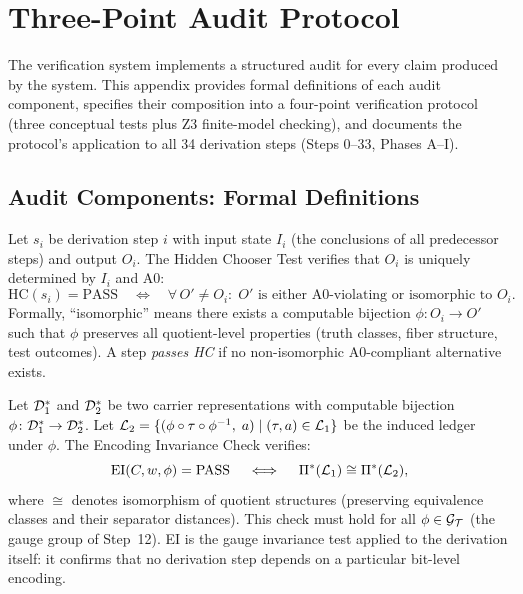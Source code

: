 \section{Three-Point Audit Protocol}
\label{app:verification}

The verification system implements a structured audit for every claim
produced by the system.  This appendix provides formal definitions of
each audit component, specifies their composition into a four-point
verification protocol (three conceptual tests plus Z3 finite-model
checking), and documents the protocol's application to all 34 derivation
steps (Steps 0--33, Phases A--I).

\subsection{Audit Components: Formal Definitions}

\begin{definition}
\label{def:hc}
Let $s_i$ be derivation step $i$ with input state $I_i$ (the conclusions
of all predecessor steps) and output $O_i$.  The Hidden Chooser Test
verifies that $O_i$ is uniquely determined by $I_i$ and A0:
\[
  \mathrm{HC}(s_i) = \mathrm{PASS} \quad\iff\quad
  \forall\, O' \neq O_i:\;
  O' \text{ is either A0-violating or isomorphic to } O_i.
\]
Formally, ``isomorphic'' means there exists a computable bijection
$\phi \colon O_i \to O'$ such that $\phi$ preserves all quotient-level
properties (truth classes, fiber structure, test outcomes).  A step
\emph{passes HC} if no non-isomorphic A0-compliant alternative exists.
\end{definition}

\begin{definition}
\label{def:ei}
Let $\mathcal{D}^*_1$ and $\mathcal{D}^*_2$ be two carrier representations with
computable bijection $\phi \colon \mathcal{D}^*_1 \to \mathcal{D}^*_2$.  Let
$\mathcal{L}_2 = \{(\phi \circ \tau \circ \phi^{-1},\; a) \mid
(\tau, a) \in \mathcal{L}_1\}$ be the induced ledger under $\phi$.  The
Encoding Invariance Check verifies:
\[
  \mathrm{EI}(C, w, \phi) = \mathrm{PASS} \quad\iff\quad
  \Pi^*(\mathcal{L}_1) \cong \Pi^*(\mathcal{L}_2),
\]
where $\cong$ denotes isomorphism of quotient structures (preserving
equivalence classes and their separator distances).  This check must hold
for all $\phi \in \mathcal{G}_{\mathcal{T}}$ (the gauge group of Step~12).  EI is the
gauge invariance test applied to the derivation itself: it confirms that
no derivation step depends on a particular bit-level encoding.
\end{definition}

